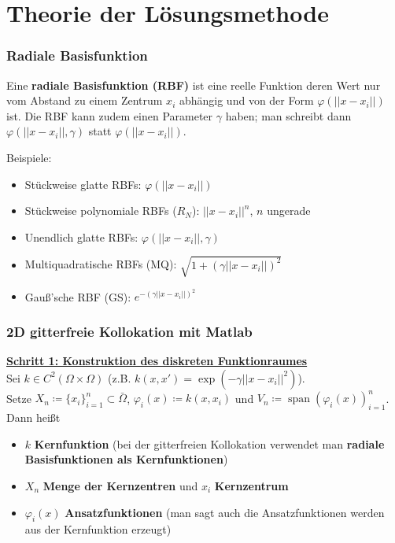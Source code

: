 \documentclass{beamer}
\DeclareMathOperator{\spn}{span}
\begin{document}
\section{Theorie der Lösungsmethode}
\begin{frame}
\frametitle{Radiale Basisfunktion}
\begin{definition}
Eine \textbf{radiale Basisfunktion (RBF)} ist eine reelle Funktion deren Wert nur vom Abstand zu einem Zentrum $x_{i}$ abhängig und von der Form $\varphi(||x-x_{i}||)$ ist. Die RBF kann zudem einen Parameter $\gamma$ haben; man schreibt dann $\varphi(||x-x_{i}||,\gamma)$ statt $\varphi(||x-x_{i}||)$.
\end{definition}
Beispiele:
\begin{itemize}
\item Stückweise glatte RBFs: $\varphi(||x-x_{i}||)$
\item Stückweise polynomiale RBFs ($R_{N}$): $||x-x_{i}||^{n}$, $n$ ungerade
\item Unendlich glatte RBFs: $\varphi(||x-x_{i}||,\gamma)$
\item Multiquadratische RBFs (MQ): $\sqrt{1+(\gamma ||x-x_{i}||)^{2}}$
\item Gauß'sche RBF (GS): $e^{-(\gamma ||x-x_{i}||)^{2}}$ 
\end{itemize}
\end{frame}

\begin{frame}[fragile]
\frametitle{2D gitterfreie Kollokation mit Matlab} %
\underline{\textbf{Schritt 1: Konstruktion des diskreten Funktionraumes}}\\
Sei $k \in C^{2}(\Omega \times \Omega)$ (z.B. $k(x,x')=\exp(-\gamma ||x-x_{i}||^{2})$). \\
Setze $X_{n} \coloneq \{x_{i}\}_{i=1}^{n} \subset \bar{\Omega}$, $\varphi_{i}(x) \coloneq k(x,x_{i})$ und $V_{n} \coloneq \spn(\varphi_{i}(x))_{i=1}^{n}$. Dann heißt
\begin{itemize}
\item $k$ \textbf{Kernfunktion} (bei der gitterfreien Kollokation verwendet man \textbf{radiale Basisfunktionen als Kernfunktionen})
\item $X_{n}$ \textbf{Menge der Kernzentren} und $x_{i}$ \textbf{Kernzentrum}
\item $\varphi_{i}(x)$ \textbf{Ansatzfunktionen} (man sagt auch \glqq die Ansatzfunktionen werden aus der Kernfunktion erzeugt\grqq)
\end{itemize}
\end{frame}
\end{document}
